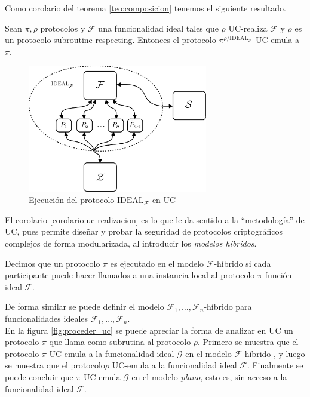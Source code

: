 Como corolario del teorema \ref{teo:composicion} tenemos el siguiente resultado.

\begin{corolario}
Sean $\pi, \rho$ protocolos y $\mathcal{F}$ una funcionalidad ideal tales que $\rho$ UC-realiza
$\mathcal{F}$ y $\rho$ es un protocolo subroutine respecting. Entonces el protocolo
$\pi^{\rho/\mathrm{IDEAL}_\mathcal{F}}$ UC-emula a $\pi$.
\label{corolario:uc-realizacion}
\end{corolario}

\begin{figure}[hp]
    \centering
    \includegraphics[width=0.7\textwidth]{figs/mundo_ideal}
    \caption{Ejecución del protocolo $\mathrm{IDEAL}_\mathcal{F}$ en UC}
    \label{fig:mundo_ideal}
\end{figure}

El corolario \ref{corolario:uc-realizacion} es lo que le da sentido a la ``metodología'' de UC,
pues permite diseñar y probar la seguridad
de protocolos criptográficos complejos de forma modularizada, al introducir los \textit{modelos
híbridos}.

\begin{definicion}
Decimos que un protocolo $\pi$ es ejecutado en el modelo $\mathcal{F}$-híbrido si cada participante puede
hacer llamados a una instancia local al protocolo $\pi$ función ideal $\mathcal{F}$. 
\end{definicion}

De forma similar se puede definir el modelo $\mathcal{F}_1, \ldots, \mathcal{F}_n$-híbrido para
funcionalidades ideales $\mathcal{F}_1, \ldots, \mathcal{F}_n$.\\

En la figura \ref{fig:proceder_uc} se puede apreciar la forma de analizar en UC un protocolo $\pi$
que llama como subrutina al protocolo $\rho$. Primero se muestra que el protocolo $\pi$ UC-emula a
la funcionalidad ideal $\mathcal{G}$ en el modelo $\mathcal{F}$-híbrido , y luego se muestra que el
protocolo$\rho$ UC-emula a la funcionalidad ideal $\mathcal{F}$. Finalmente se puede concluir que
$\pi$ UC-emula $\mathcal{G}$ en el modelo \textit{plano}, esto es, sin acceso a la funcionalidad
ideal $\mathcal{F}$.

